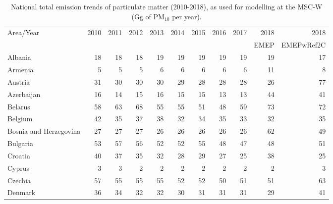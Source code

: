  \begin{table}
 \caption{National total emission trends of particulate matter (2010-2018), as used for modelling at the MSC-W (Gg of PM$_{10}$ per year).}
 
 \vspace{15pt}
 
 \scriptsize
 \centering
 \begin{tabular}{|l|r|r|r|r|r|r|r|r|r|r|}
 \hline
                     Area/Year&   2010&   2011&   2012&   2013&   2014&   2015&   2016&   2017&   2018& 2018\\
                &&&&&&&&&EMEP&EMEPwRef2C\\\hline\hline
                       Albania&     18&     18&     18&     19&     19&     19&     19&     19&     19&     17\\\hline
                       Armenia&      5&      5&      5&      6&      6&      6&      6&      6&     11&      8\\\hline
                       Austria&     31&     30&     30&     30&     29&     28&     28&     28&     26&     77\\\hline
                    Azerbaijan&     16&     14&     15&     16&     15&     15&     13&     13&     44&     41\\\hline
                       Belarus&     58&     63&     68&     55&     55&     51&     48&     59&     73&     72\\\hline
                       Belgium&     42&     35&     37&     38&     32&     34&     35&     33&     32&     35\\\hline
        Bosnia and Herzegovina&     27&     27&     27&     26&     26&     26&     26&     26&     62&     49\\\hline
                      Bulgaria&     53&     57&     56&     52&     52&     55&     48&     47&     48&     51\\\hline
                       Croatia&     40&     37&     35&     32&     28&     29&     27&     25&     38&     25\\\hline
                        Cyprus&      3&      3&      2&      2&      2&      2&      2&      2&      2&      3\\\hline
                       Czechia&     57&     55&     55&     55&     52&     52&     50&     51&     51&     63\\\hline
                       Denmark&     36&     34&     32&     32&     30&     31&     31&     31&     29&     41\\\hline

\end{tabular}
\end{table}
